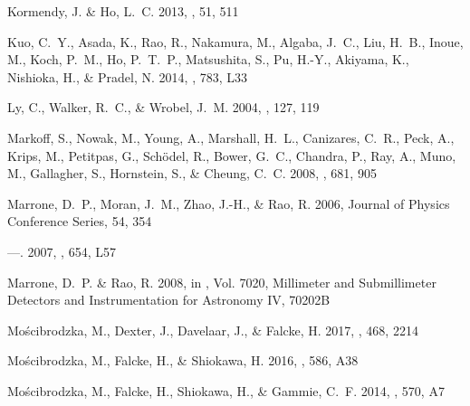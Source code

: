 \documentclass[12pt,preprint]{aastex}
\begin{document}
\begin{thebibliography}{34}
{Kormendy}, J. \& {Ho}, L.~C. 2013, \araa, 51, 511

{Kuo}, C.~Y., {Asada}, K., {Rao}, R., {Nakamura}, M., {Algaba}, J.~C., {Liu},
  H.~B., {Inoue}, M., {Koch}, P.~M., {Ho}, P.~T.~P., {Matsushita}, S., {Pu},
  H.-Y., {Akiyama}, K., {Nishioka}, H., \& {Pradel}, N. 2014, \apjl, 783, L33

{Ly}, C., {Walker}, R.~C., \& {Wrobel}, J.~M. 2004, \aj, 127, 119

{Markoff}, S., {Nowak}, M., {Young}, A., {Marshall}, H.~L., {Canizares}, C.~R.,
  {Peck}, A., {Krips}, M., {Petitpas}, G., {Sch{\"o}del}, R., {Bower}, G.~C.,
  {Chandra}, P., {Ray}, A., {Muno}, M., {Gallagher}, S., {Hornstein}, S., \&
  {Cheung}, C.~C. 2008, \apj, 681, 905

{Marrone}, D.~P., {Moran}, J.~M., {Zhao}, J.-H., \& {Rao}, R. 2006, Journal of
  Physics Conference Series, 54, 354

---. 2007, \apjl, 654, L57

{Marrone}, D.~P. \& {Rao}, R. 2008, in \procspie, Vol. 7020, Millimeter and
  Submillimeter Detectors and Instrumentation for Astronomy IV, 70202B

{Mo{\'s}cibrodzka}, M., {Dexter}, J., {Davelaar}, J., \& {Falcke}, H. 2017,
  \mnras, 468, 2214

{Mo{\'s}cibrodzka}, M., {Falcke}, H., \& {Shiokawa}, H. 2016, \aap, 586, A38

{Mo{\'s}cibrodzka}, M., {Falcke}, H., {Shiokawa}, H., \& {Gammie}, C.~F. 2014,
  \aap, 570, A7


\end{thebibliography}
\end{document}
